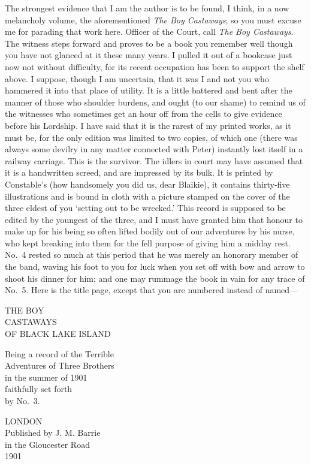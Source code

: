 The strongest evidence that I am the author is to be found, I think,
in a now melancholy volume, the aforementioned \emph{The Boy Castaways};
so you must excuse me for parading that work here.
Officer of the Court, call \emph{The Boy Castaways}.
The witness steps forward and proves to be a book you remember well
though you have not glanced at it these many years.
I pulled it out of a bookcase just now not without difficulty,
for its recent occupation has been to support the shelf above.
I suppose, though I am uncertain,
that it was I and not you who hammered it into that place of utility.
It is a little battered and bent after the manner of those who shoulder burdens,
and ought (to our shame) to remind us of the witnesses
who sometimes get an hour off from the cells to give evidence before his Lordship.
I have said that it is the rarest of my printed works, as it must be,
for the only edition was limited to two copies, of which one
(there was always some devilry in any matter connected with Peter)
instantly lost itself in a railway carriage.
This is the survivor.
The idlers in court may have assumed that it is a handwritten screed, and are impressed by its bulk.
It is printed by Constable’s
(how handsomely you did us, dear Blaikie),
it contains thirty‐five illustrations
and is bound in cloth with a picture stamped on the cover
of the three eldest of you ‘setting out to be wrecked.’
This record is supposed to be edited by the youngest of the three,
and I must have granted him that honour
to make up for his being so often lifted bodily out of our adventures by his nurse,
who kept breaking into them for the fell purpose of giving him a midday rest.
No.~4 rested so much at this period that he was merely an honorary member of the band,
waving his foot to you for luck when you set off with bow and arrow to shoot his dinner for him;
and one may rummage the book in vain for any trace of No.~5.
Here is the title page, except that you are numbered instead of named—

\begin{center}
\begin{samepage}
	\uppercase{The Boy\\Castaways\\of Black Lake Island}

	Being a record of the Terrible\\
	Adventures of Three Brothers\\
	in the summer of 1901\\
	faithfully set forth\\by No.~3.

	LONDON\\[\baselineskip]

	Published by J. M. Barrie\\
	in the Gloucester Road\\
	1901
\end{samepage}
\end{center}

